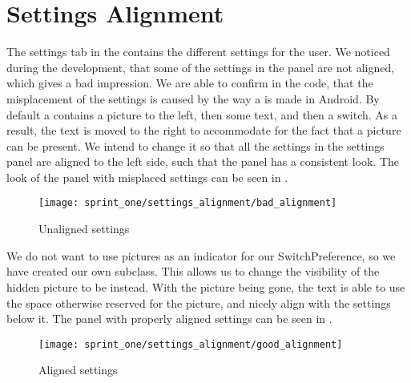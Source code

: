 \section{Settings Alignment}
\label{sec:settings_alignment}


The settings tab in the \launcher contains the different settings for the user. We noticed during the development, that some of the settings in the panel are not aligned, which gives a bad impression. We are able to confirm in the code, that the misplacement of the settings is caused by the way a  is made in Android. By default a  contains a picture to the left, then some text, and then a switch. As a result, the text is moved to the right to accommodate for the fact that a picture can be present. We intend to change it so that all the settings in the settings panel are aligned to the left side, such that the panel has a consistent look. The look of the panel with misplaced settings can be seen in .

\begin{figure}[!htbp]
    \centering
    \texttt{[image: sprint\_one/settings\_alignment/bad\_alignment]}
    \caption{Unaligned settings}
    \label{fig:settings_alignment_bad}
\end{figure}

We do not want to use pictures as an indicator for our SwitchPreference, so we have created our own  subclass. This allows us to change the visibility of the hidden picture to be  instead. With the picture being gone, the text is able to use the space otherwise reserved for the picture, and nicely align with the settings below it. The panel with properly aligned settings can be seen in .

\begin{figure}[!htbp]
    \centering
    \texttt{[image: sprint\_one/settings\_alignment/good\_alignment]}
    \caption{Aligned settings}
    \label{fig:settings_alignment_good}
\end{figure}